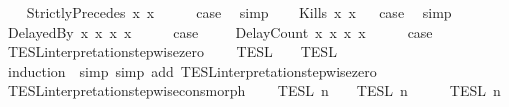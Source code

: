 \begin{isabellebody}
\isanewline
\ \ \isamarkupfalse%
\ {\isacharparenleft}StrictlyPrecedes\ x{}\ x{}{\isacharparenright}\isanewline
\ \ \isamarkupfalse%
\ \isamarkupfalse%
\ {\isacharquery}case\ \isamarkupfalse%
\ simp\isanewline
{}\isamarkupfalse%
\isanewline
\ \ \isamarkupfalse%
\ {\isacharparenleft}Kills\ x{}\ x{}{\isacharparenright}\isanewline
{}\isamarkupfalse%
\ \isamarkupfalse%
\ {\isacharquery}case\ \isamarkupfalse%
\ simp\isanewline
{}\isamarkupfalse%
\isanewline
\ \ \isamarkupfalse%
\ {\isacharparenleft}DelayedBy\ x{}\ x{}\ x{}\ x{}{\isacharparenright}\isanewline
\ \ \isamarkupfalse%
\ \isamarkupfalse%
\ {\isacharquery}case\ \isamarkupfalse%
\isanewline
{}\isamarkupfalse%
\isanewline
\ \ \isamarkupfalse%
\ {\isacharparenleft}DelayCount\ x{}\ x{}\ x{}\ x{}{\isacharparenright}\isanewline
\ \ \isamarkupfalse%
\ \isamarkupfalse%
\ {\isacharquery}case\ \isamarkupfalse%
\isanewline
{}\isamarkupfalse%
%
\endisatagproof
{\isafoldproof}%
%
\isadelimproof
\isanewline
%
\endisadelimproof
\isanewline
{}\isamarkupfalse%
\ TESL{\isacharunderscore}interpretation{\isacharunderscore}stepwise{\isacharunderscore}zero{\isacharprime}{\isacharcolon}\isanewline
\ \ {\isacartoucheopen}{\isasymlbrakk}{\isasymlbrakk}\ {\isasymPhi}\ {\isasymrbrakk}{\isasymrbrakk}\isactrlsub T\isactrlsub E\isactrlsub S\isactrlsub L\ {\isacharequal}\ {\isasymlbrakk}{\isasymlbrakk}\ {\isasymPhi}\ {\isasymrbrakk}{\isasymrbrakk}\isactrlsub T\isactrlsub E\isactrlsub S\isactrlsub L\isactrlbsup {\isasymge}\ {}\isactrlesup {\isacartoucheclose}\isanewline
%
\isadelimproof
%
\endisadelimproof
%
\isatagproof
{}\isamarkupfalse%
\ {\isacharparenleft}induction\ {\isasymPhi}{\isacharcomma}\ simp{\isacharcomma}\ simp\ add{\isacharcolon}\ TESL{\isacharunderscore}interpretation{\isacharunderscore}stepwise{\isacharunderscore}zero{\isacharparenright}%
\endisatagproof
{\isafoldproof}%
%
\isadelimproof
\isanewline
%
\endisadelimproof
\isanewline
{}\isamarkupfalse%
\ TESL{\isacharunderscore}interpretation{\isacharunderscore}stepwise{\isacharunderscore}cons{\isacharunderscore}morph{\isacharcolon}\isanewline
\ \ {\isacartoucheopen}{\isasymlbrakk}\ {\isasymphi}\ {\isasymrbrakk}\isactrlsub T\isactrlsub E\isactrlsub S\isactrlsub L\isactrlbsup {\isasymge}\ n\isactrlesup \ {\isasyminter}\ {\isasymlbrakk}{\isasymlbrakk}\ {\isasymPhi}\ {\isasymrbrakk}{\isasymrbrakk}\isactrlsub T\isactrlsub E\isactrlsub S\isactrlsub L\isactrlbsup {\isasymge}\ n\isactrlesup \ {\isacharequal}\ {\isasymlbrakk}{\isasymlbrakk}\ {\isasymphi}\ {\isacharhash}\ {\isasymPhi}\ {\isasymrbrakk}{\isasymrbrakk}\isactrlsub T\isactrlsub E\isactrlsub S\isactrlsub L\isactrlbsup {\isasymge}\ n\isactrlesup {\isacartoucheclose}\isanewline

\end{isabellebody}
